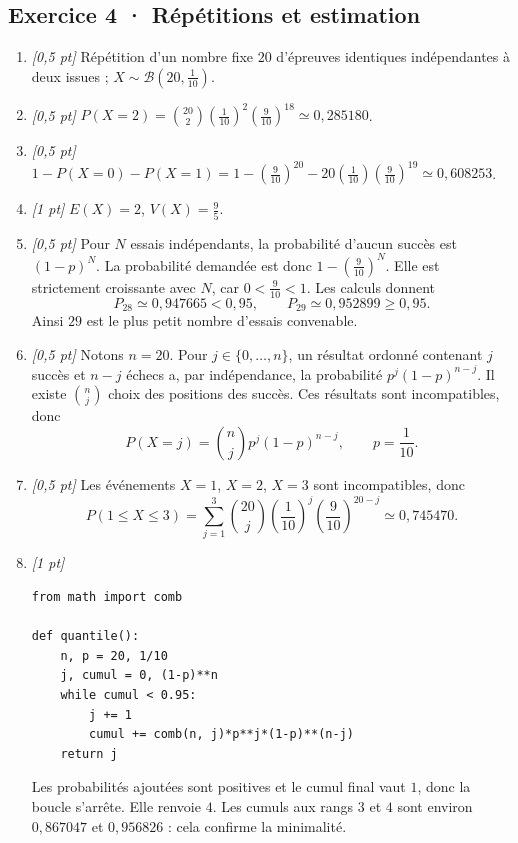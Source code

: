 \subsection*{Exercice 4 · Répétitions et estimation}\begin{enumerate}

\item \textit{[0,5 pt]} Répétition d'un nombre fixe $20$ d'épreuves identiques indépendantes à deux issues ; $X\sim\mathcal B(20,\frac{1}{10})$.

\item \textit{[0,5 pt]} $P(X=2)=\binom{20}2(\frac{1}{10})^2(\frac{9}{10})^{18}\simeq0{,}285180$.

\item \textit{[0,5 pt]} $1-P(X=0)-P(X=1)=1-(\frac{9}{10})^{20}-20(\frac{1}{10})(\frac{9}{10})^{19}\simeq0{,}608253$.

\item \textit{[1 pt]} $E(X)=2$, $V(X)=\frac{9}{5}$.

\item \textit{[0,5 pt]} Pour $N$ essais indépendants, la probabilité d'aucun succès est $(1-p)^N$. La probabilité demandée est donc $1-(\frac{9}{10})^N$. Elle est strictement croissante avec $N$, car $0<\frac{9}{10}<1$. Les calculs donnent
\[P_{28}\simeq0{,}947665<0{,}95,\qquad P_{29}\simeq0{,}952899\ge0{,}95.\]
Ainsi $29$ est le plus petit nombre d'essais convenable.

\item \textit{[0,5 pt]} Notons $n=20$. Pour $j\in\{0,\ldots,n\}$, un résultat ordonné contenant $j$ succès et $n-j$ échecs a, par indépendance, la probabilité $p^j(1-p)^{n-j}$. Il existe $\binom nj$ choix des positions des succès. Ces résultats sont incompatibles, donc
\[P(X=j)=\binom nj p^j(1-p)^{n-j},\qquad p=\frac{1}{10}.\]

\item \textit{[0,5 pt]} Les événements $X=1$, $X=2$, $X=3$ sont incompatibles, donc
\[P(1\le X\le3)=\sum_{j=1}^3\binom{20}j(\frac{1}{10})^j(\frac{9}{10})^{20-j}\simeq0{,}745470.\]


\item \textit{[1 pt]} 
\begin{lstlisting}
from math import comb

def quantile():
    n, p = 20, 1/10
    j, cumul = 0, (1-p)**n
    while cumul < 0.95:
        j += 1
        cumul += comb(n, j)*p**j*(1-p)**(n-j)
    return j
\end{lstlisting}
Les probabilités ajoutées sont positives et le cumul final vaut $1$, donc la boucle s'arrête. Elle renvoie $4$. Les cumuls aux rangs $3$ et $4$ sont environ $0{,}867047$ et $0{,}956826$ : cela confirme la minimalité.

\end{enumerate}

\fi

\fi


